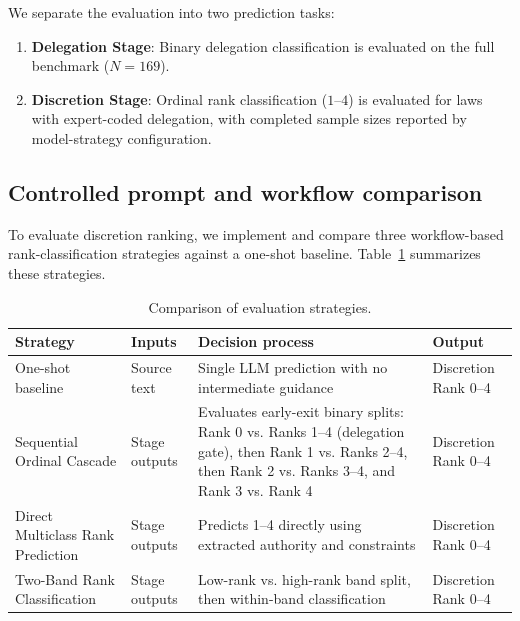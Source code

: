 \documentclass[runningheads]{llncs}
\begin{document}
We separate the evaluation into two prediction tasks:

\begin{enumerate}[nosep]

    \item \textbf{Delegation Stage}: Binary delegation classification is evaluated on the full benchmark ($N=169$).

    \item \textbf{Discretion Stage}: Ordinal rank classification ($1$--$4$) is evaluated for laws with expert-coded delegation, with completed sample sizes reported by model-strategy configuration.

\end{enumerate}

\vspace{-0.3 cm}
\subsection{Controlled prompt and workflow comparison}

To evaluate discretion ranking, we implement and compare three workflow-based rank-classification strategies against a one-shot baseline. Table~\ref{tab:strategies_comparison} summarizes these strategies.

\begin{table}[t]
\centering
\caption{Comparison of evaluation strategies.}
\label{tab:strategies_comparison}
\footnotesize
\begin{tabularx}{\textwidth}{@{}
>{\raggedright\arraybackslash}p{}
>{\raggedright\arraybackslash}p{}
>{\raggedright\arraybackslash}X
>{\raggedright\arraybackslash}p{}@{}}
\toprule
\textbf{Strategy} & \textbf{Inputs} & \textbf{Decision process} & \textbf{Output} \\
\midrule
One-shot baseline & Source text & Single LLM prediction with no intermediate guidance & Discretion Rank 0--4 \\
Sequential Ordinal Cascade & Stage outputs & Evaluates early-exit binary splits: Rank 0 vs. Ranks 1--4 (delegation gate), then Rank 1 vs. Ranks 2--4, then Rank 2 vs. Ranks 3--4, and Rank 3 vs. Rank 4 & Discretion Rank 0--4 \\
Direct Multiclass Rank Prediction & Stage outputs & Predicts 1--4 directly using extracted authority and constraints & Discretion Rank 0--4 \\
Two-Band Rank Classification & Stage outputs & Low-rank vs. high-rank band split, then within-band classification & Discretion Rank 0--4 \\

\bottomrule
\end{tabularx}
\end{table}
\vspace{-0.3 cm}
\end{document}
